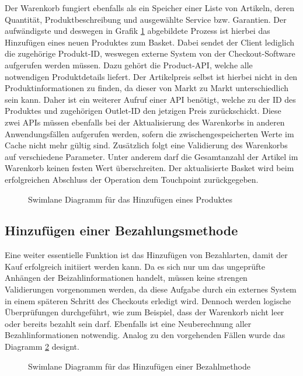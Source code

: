 Der Warenkorb fungiert ebenfalls als ein Speicher einer Liste von Artikeln, deren Quantität, Produktbeschreibung und ausgewählte Service bzw. Garantien. Der aufwändigste und deswegen in Grafik \ref{fig:SL-AddProduct} abgebildete Prozess ist hierbei das Hinzufügen eines neuen Produktes zum Basket. Dabei sendet der Client lediglich die zugehörige Produkt-ID, weswegen externe System von der Checkout-Software aufgerufen werden müssen. Dazu gehört die Product-API, welche alle notwendigen Produktdetails liefert. Der Artikelpreis selbst ist hierbei nicht in den Produktinformationen zu finden, da dieser von Markt zu Markt unterschiedlich sein kann. Daher ist ein weiterer Aufruf einer API benötigt, welche zu der ID des Produktes und zugehörigen Outlet-ID den jetzigen Preis zurückschickt. Diese zwei APIs müssen ebenfalls bei der Aktualisierung des Warenkorbs in anderen Anwendungsfällen aufgerufen werden, sofern die zwischengespeicherten Werte im Cache nicht mehr gültig sind. Zusätzlich folgt eine Validierung des Warenkorbs auf verschiedene Parameter. Unter anderem darf die Gesamtanzahl der Artikel im Warenkorb keinen festen Wert überschreiten. Der aktualisierte Basket wird beim erfolgreichen Abschluss der Operation dem Touchpoint zurückgegeben.

\begin{figure}[htbp]
	\centering
	
	\caption{Swimlane Diagramm für das Hinzufügen eines Produktes }
	\label{fig:SL-AddProduct}
\end{figure}

\subsection{Hinzufügen einer Bezahlungsmethode}

Eine weiter essentielle Funktion ist das Hinzufügen von Bezahlarten, damit der Kauf erfolgreich initiiert werden kann.  Da es sich nur um das ungeprüfte Anhängen der Beizahlinformationen handelt, müssen keine strengen Validierungen vorgenommen werden, da diese Aufgabe durch ein externes System in einem späteren Schritt des Checkouts erledigt wird. Dennoch werden logische Überprüfungen durchgeführt, wie zum Beispiel, dass der Warenkorb nicht leer oder bereits bezahlt sein darf. Ebenfalls ist eine Neuberechnung aller Bezahlinformationen notwendig. Analog zu den vorgehenden Fällen wurde das Diagramm \ref{fig:SL-PutBezahlmethode} designt.

\begin{figure}[htbp]
	\centering
	
	\caption{Swimlane Diagramm für das Hinzufügen einer Bezahlmethode}
	\label{fig:SL-PutBezahlmethode}
\end{figure}

